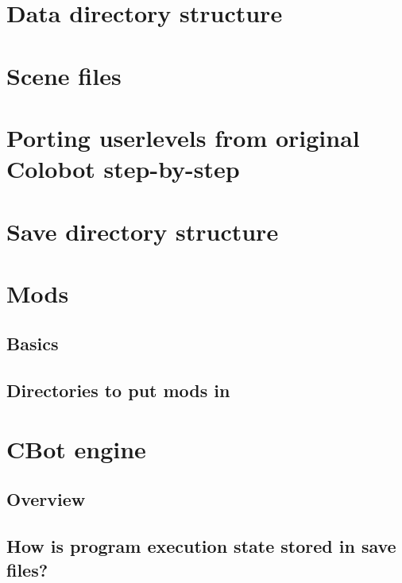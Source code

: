\chapter{Data directory structure}


\chapter{Scene files}


\chapter{Porting userlevels from original Colobot step-by-step}


\chapter{Save directory structure}



\chapter{Mods}

\section{Basics}

\section{Directories to put mods in}



\chapter{CBot engine}


\section{Overview}


\section{How is program execution state stored in save files?}
